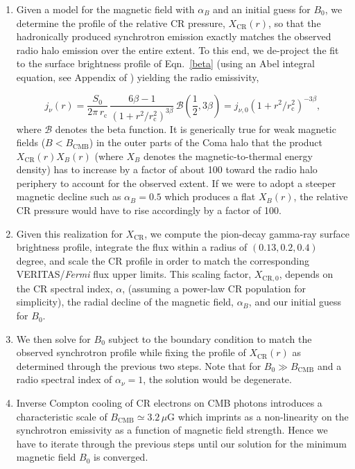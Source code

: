 \documentclass[12pt,manuscript]{aastex}
\newcommand{\rmn}{\mathrm}
\newcommand{\CR}{\mathrm{CR}}
\begin{document}
\begin{enumerate}
\item
Given a model for the magnetic field with $\alpha_B$ and an initial guess for $B_0$, we determine
the profile of the relative CR pressure, $X_{\CR}(r)$, so that the hadronically produced
synchrotron emission exactly matches the observed radio halo emission over the entire extent. To 
this end, we de-project the fit to the surface brightness profile of Eqn.~\ref{beta} (using an Abel
integral equation, see Appendix of \citealt{article:PfrommerEnsslin:2004b}) yielding the radio
emissivity,

\begin{equation}
\label{eq:Coma:radio}
j_{\nu} (r) = \frac{S_{0}}{2\pi\, r_{\rmn{c}}}\,
\frac{6\beta - 1}{\left(1 + r^{2}/r_{\rmn{c}}^{2}\right)^{3 \beta}}\,
\mathcal{B}\left(\frac{1}{2}, 3\beta\right)
= j_{\nu,0} \left(1 + r^2/r_{\rmn{c}}^{2}\right)^{-3 \beta},
\end{equation}
where $\mathcal{B}$ denotes the beta function. It is generically true for weak magnetic fields
($B<B_{\rmn{CMB}}$) in the outer parts of the Coma halo that the product $X_{\CR}(r)X_{B}(r)$
(where $X_B$ denotes the magnetic-to-thermal energy density) has to increase by a factor of about
100 toward the radio halo periphery to account for the observed extent. If we were to adopt a
steeper magnetic decline such as $\alpha_{B}=0.5$ which produces a flat $X_{B}(r)$, the relative CR
pressure would have to rise accordingly by a factor of 100.

\item
Given this realization for $X_{\CR}$, we compute the pion-decay gamma-ray surface brightness
profile, integrate the flux within a radius of $(0.13, 0.2, 0.4)$ degree, and scale the CR profile
in order to match the corresponding VERITAS/{\em Fermi} flux upper limits. This scaling factor,
$X_{\CR,0}$, depends on the CR spectral index, $\alpha$, (assuming a power-law CR population for
simplicity), the radial decline of the magnetic field, $\alpha_{B}$, and our initial guess for
$B_0$.

\item
We then solve for $B_{0}$ subject to the boundary condition to match the observed synchrotron
profile while fixing the profile of $X_{\CR}(r)$ as determined through the previous two steps. Note
that for $B_{0} \gg B_{\rmn{CMB}}$ and a radio spectral index of $\alpha_{\nu}=1$, the solution
would be degenerate.

\item
Inverse Compton cooling of CR electrons on CMB photons introduces a characteristic scale of
$B_\rmn{CMB}\simeq 3.2\,\mu$G which imprints as a non-linearity on the synchrotron emissivity as a
function of magnetic field strength. Hence we have to iterate through the previous steps until our
solution for the minimum magnetic field $B_0$ is converged.
\end{enumerate}
\end{document}
